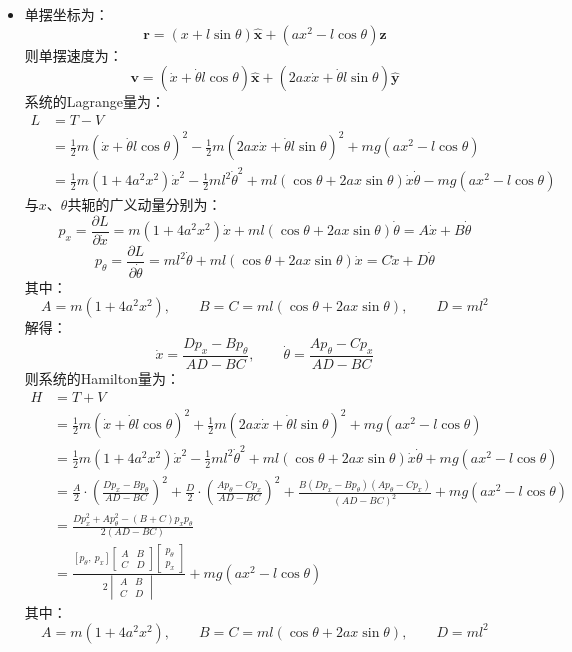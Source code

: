 \documentclass[a4paper,fontset=windows]{ctexart}
\begin{document}
\begin{itemize}
        \item[6.3]
        单摆坐标为：
        \[
        \bm{r} = (x + l\sin\theta)\bm{\hat{x}} + (ax^2 - l\cos\theta)\bm{\hat{z}}
        \]
        则单摆速度为：
        \[
        \bm{v} = (\dot{x} + \dot{\theta}l\cos\theta)\bm{\hat{x}} + (2ax\dot{x} + \dot{\theta}l\sin\theta)\bm{\hat{y}}
        \]
        系统的Lagrange量为：
        \begin{align*}
            L
            &= T-V \\
            &= \frac{1}{2}m(\dot{x} + \dot{\theta}l\cos\theta)^2 - \frac{1}{2}m(2ax\dot{x} + \dot{\theta}l\sin\theta)^2 + mg(ax^2 - l\cos\theta) \\
            &= \frac{1}{2}m(1+4a^2x^2)\dot{x}^2 - \frac{1}{2}ml^2\dot{\theta}^2 + ml(\cos\theta + 2ax\sin\theta)\dot{x}\dot{\theta} - mg(ax^2 - l\cos\theta)
        \end{align*}
        与$x$、$\theta$共轭的广义动量分别为：
        \[
        p_x = \frac{\partial L}{\partial\dot{x}} = m(1+4a^2x^2)\dot{x} + ml(\cos\theta + 2ax\sin\theta)\dot{\theta} = A\dot{x} + B\dot{\theta}
        \]
        \[
        p_\theta = \frac{\partial L}{\partial\dot{\theta}} = ml^2\dot{\theta} + ml(\cos\theta + 2ax\sin\theta)\dot{x} = C\dot{x} + D\dot{\theta}
        \]
        其中：
        \[
        A = m(1+4a^2x^2),\qquad B = C = ml(\cos\theta +2ax\sin\theta),\qquad D = ml^2
        \]
        解得：
        \[
        \dot{x} = \frac{Dp_x - Bp_\theta}{AD - BC},\qquad \dot{\theta} = \frac{Ap_\theta - Cp_x}{AD - BC}
        \]
        则系统的Hamilton量为：
        \begin{align*}
            H
            &= T+V \\
            &= \frac{1}{2}m(\dot{x} + \dot{\theta}l\cos\theta)^2 + \frac{1}{2}m(2ax\dot{x} + \dot{\theta}l\sin\theta)^2 + mg(ax^2 - l\cos\theta) \\
            &= \frac{1}{2}m(1+4a^2x^2)\dot{x}^2 - \frac{1}{2}ml^2\dot{\theta}^2 + ml(\cos\theta + 2ax\sin\theta)\dot{x}\dot{\theta} + mg(ax^2 - l\cos\theta) \\
            &= \frac{A}{2}\cdot\left(\frac{Dp_x - Bp_\theta}{AD - BC}\right)^2 + \frac{D}{2}\cdot\left(\frac{Ap_\theta - Cp_x}{AD - BC}\right)^2 + \frac{B(Dp_x - Bp_\theta)(Ap_\theta - Cp_x)}{(AD - BC)^2} + mg(ax^2 - l\cos\theta) \\
            &= \frac{Dp_x^2 + Ap_\theta^2 - (B+C)p_x p_\theta}{2(AD - BC)} \\
            &= \frac{[p_\theta,\ p_x]\begin{bmatrix}A & B \\ C & D\end{bmatrix}\begin{bmatrix}p_\theta \\ p_x\end{bmatrix}}{2\begin{vmatrix}A & B \\ C & D\end{vmatrix}} + mg(ax^2 - l\cos\theta)
        \end{align*}
        其中：
        \[
        A = m(1+4a^2x^2),\qquad B = C = ml(\cos\theta +2ax\sin\theta),\qquad D = ml^2
        \]
        \bigskip


\end{itemize}
\end{document}
